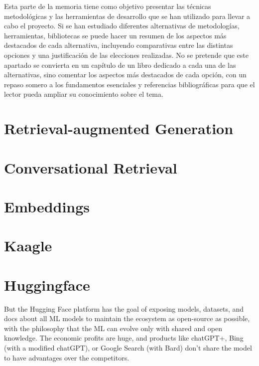 
Esta parte de la memoria tiene como objetivo presentar las técnicas metodológicas y las herramientas de desarrollo que se han utilizado para llevar a cabo el proyecto. Si se han estudiado diferentes alternativas de metodologías, herramientas, bibliotecas se puede hacer un resumen de los aspectos más destacados de cada alternativa, incluyendo comparativas entre las distintas opciones y una justificación de las elecciones realizadas. 
No se pretende que este apartado se convierta en un capítulo de un libro dedicado a cada una de las alternativas, sino comentar los aspectos más destacados de cada opción, con un repaso somero a los fundamentos esenciales y referencias bibliográficas para que el lector pueda ampliar su conocimiento sobre el tema.


\section{Retrieval-augmented Generation}

\section{Conversational Retrieval}

\section{Embeddings}

\section{Kaagle}

\section{Huggingface}

But the Hugging Face platform has the goal of exposing models, datasets, and docs about all ML models to maintain the ecosystem as open-source as possible, with the philosophy that the ML can evolve only with shared and open knowledge. The economic profits are huge, and products like chatGPT+, Bing (with a modified chatGPT), or Google Search (with Bard) don’t share the model to have advantages over the competitors.
